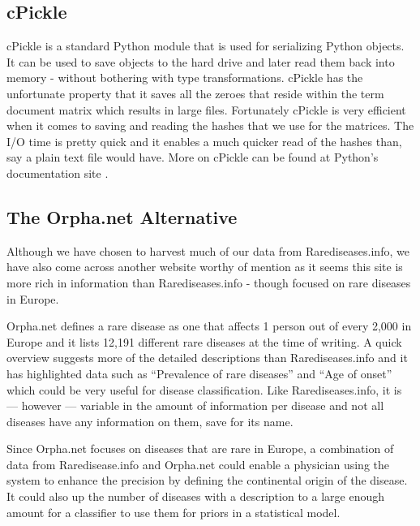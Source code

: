 \subsection{cPickle}

cPickle is a standard Python module that is used for serializing
Python objects. It can be used to save objects to the hard drive and
later read them back into memory - without bothering with type
transformations. cPickle has the unfortunate property that it saves
all the zeroes that reside within the term document matrix which
results in large files. Fortunately cPickle is very efficient when it
comes to saving and reading the hashes that we use for the
matrices. The I/O time is pretty quick and it enables a much quicker
read of the hashes than, say a plain text file would have. More on
cPickle can be found at Python's documentation site
\cite{cPicklePython}.

\subsection{The Orpha.net Alternative\label{Orphanet}}

Although we have chosen to harvest much of our data from
Rarediseases.info, we have also come across another website worthy of
mention as it seems this site is more rich in information than
Rarediseases.info - though focused on rare diseases in Europe.

Orpha.net defines a rare disease as one that affects 1 person out of 
every 2,000 in Europe and it lists 12,191 different rare diseases at 
the time of writing. A quick overview suggests more of the detailed 
descriptions than Rarediseases.info and it has highlighted data such 
as ``Prevalence of rare diseases'' and ``Age of onset'' which could be very 
useful for disease classification. Like Rarediseases.info, it is 
--- however --- variable in the amount of information per disease and 
not all diseases have any information on them, save for its name.

Since Orpha.net focuses on diseases that are rare in Europe, a combination 
of data from Raredisease.info and Orpha.net could enable a physician using 
the system to enhance the precision by defining the continental origin of 
the disease. It could also up the number of diseases with a description to 
a large enough amount for a classifier to use them for priors in a 
statistical model. 

